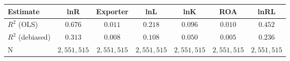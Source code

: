 \begin{tabular}{l*{6}{c}}
\hline\hline
 Estimate & lnR & Exporter & lnL & lnK & ROA & lnRL \\
\hline
\addlinespace $ R^2$ (OLS) & $0.676$ & $0.011$ & $0.218$ & $0.096$ & $0.010$ & $0.452$ \\
$ R^2$ (debiased) & $0.313$ & $0.008$ & $0.108$ & $0.050$ & $0.005$ & $0.236$ \\
N & $2,551,515$ & $2,551,515$ & $2,551,515$ & $2,551,515$ & $2,551,515$ & $2,551,515$ \\
\hline\hline
\end{tabular}
